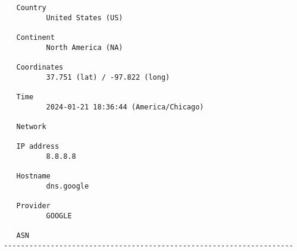 \documentclass[
	letterpaper, %
	10pt, %
]{CSUniSchoolLabReport}
\begin{document}
\begin{center}
\begin{verbatim}
   Country
          United States (US)

   Continent
          North America (NA)

   Coordinates
          37.751 (lat) / -97.822 (long)

   Time
          2024-01-21 18:36:44 (America/Chicago)

   Network

   IP address
          8.8.8.8

   Hostname
          dns.google

   Provider
          GOOGLE

   ASN
--------------------------------------------------------------------

\end{verbatim}
\end{center}
\end{document}
